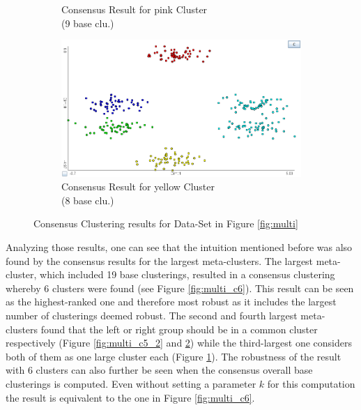 \documentclass[
	a4paper,
	english,
	twoside,
	openright,               
	11pt                            
	]{report}
\begin{document}
\begin{figure}[h]
\begin{subfigure}[t]{.49\textwidth}
  \caption{Consensus Result for pink Cluster\\(9 base clu.)}
  \label{fig:multi_c4}
\end{subfigure}
\hfill
\begin{subfigure}[t]{.49\textwidth}
  \centering
  \includegraphics[width=.98\linewidth]{multi_c5_1}
  \caption{Consensus Result for yellow Cluster\\(8 base clu.)}
  \label{fig:multi_c5_1}
\end{subfigure}

\caption{Consensus Clustering results for Data-Set in Figure \ref{fig:multi}}
\label{fig:multi_consres}
\end{figure}

Analyzing those results, one can see that the intuition mentioned before was also found by the consensus results for the largest meta-clusters. The largest meta-cluster, which included 19 base clusterings, resulted in a consensus clustering whereby $6$ clusters were found (see Figure \ref{fig:multi_c6}). This result can be seen as the highest-ranked one and therefore most robust as it includes the largest number of clusterings deemed robust. The second and fourth largest meta-clusters found that the left or right group should be in a common cluster respectively (Figure \ref{fig:multi_c5_2} and \ref{fig:multi_c5_1}) while the third-largest one considers both of them as one large cluster each (Figure \ref{fig:multi_c4}). The robustness of the result with $6$ clusters can also further be seen when the consensus overall base clusterings is computed. Even without setting a parameter $k$ for this computation the result is equivalent to the one in Figure \ref{fig:multi_c6}.
\end{document}
